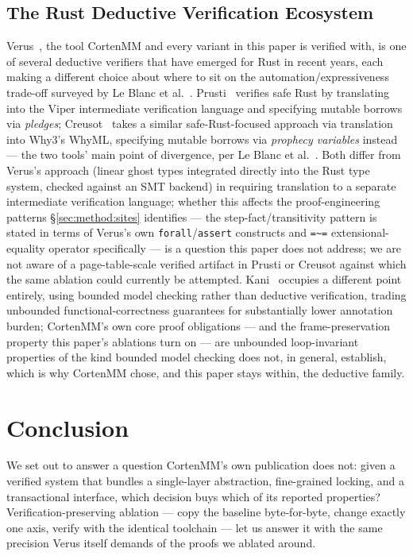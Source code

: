 \documentclass[10pt]{article}
\newcommand{\vfn}[1]{\texttt{#1}}
\begin{document}
\subsection{The Rust Deductive Verification Ecosystem}
\label{sec:related:rust-ecosystem}

Verus~\cite{verus}, the tool CortenMM and every variant in this paper
is verified with, is one of several deductive verifiers that have
emerged for Rust in recent years, each making a different choice about
where to sit on the automation/expressiveness trade-off surveyed by Le
Blanc et al.~\cite{rust-verification-survey}. Prusti~\cite{prusti}
verifies safe Rust by translating into the Viper intermediate
verification language and specifying mutable borrows via
\emph{pledges}; Creusot~\cite{creusot} takes a similar
safe-Rust-focused approach via translation into Why3's WhyML,
specifying mutable borrows via \emph{prophecy variables} instead ---
the two tools' main point of divergence, per Le Blanc et
al.~\cite{rust-verification-survey}. Both differ from Verus's approach
(linear ghost types integrated directly into the Rust type system,
checked against an SMT backend) in requiring translation to a
separate intermediate verification language; whether this affects the
proof-engineering patterns \S\ref{sec:method:sites} identifies ---
the step-fact/transitivity pattern is stated in terms of Verus's own
\vfn{forall}/\vfn{assert} constructs and \vfn{=\textasciitilde{}=}
extensional-equality operator specifically --- is a question this
paper does not address; we are not aware of a page-table-scale
verified artifact in Prusti or Creusot against which the same ablation
could currently be attempted. Kani~\cite{kani} occupies a different
point entirely, using bounded model checking rather than deductive
verification, trading unbounded functional-correctness guarantees for
substantially lower annotation burden; CortenMM's own core proof
obligations --- and the frame-preservation property this paper's
ablations turn on --- are unbounded loop-invariant properties of the
kind bounded model checking does not, in general, establish, which is
why CortenMM chose, and this paper stays within, the deductive family.


\section{Conclusion}
\label{sec:conclusion}

We set out to answer a question CortenMM's own publication does not:
given a verified system that bundles a single-layer abstraction,
fine-grained locking, and a transactional interface, which decision
buys which of its reported properties? Verification-preserving
ablation --- copy the baseline byte-for-byte, change exactly one axis,
verify with the identical toolchain --- let us answer it with the same
precision Verus itself demands of the proofs we ablated around.
\end{document}
